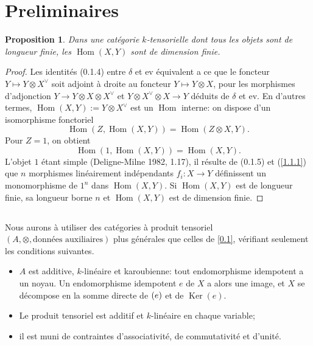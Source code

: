 \documentclass[11pt,a4paper]{article}
\theoremstyle{plain}
\newtheorem{proposition}[theorem]{Proposition}
\theoremstyle{definition}
\DeclareMathOperator{\Hom}{Hom}
\DeclareMathOperator{\Ker}{Ker}
\let\Im\relax
\DeclareMathOperator{\Im}{Im}
\newcommand{\ev}{\mathrm{ev}}
\begin{document}
\section{Preliminaires}\label{1}

\begin{proposition}\label{1.1}
Dans une cat\'egorie $k$-tensorielle dont tous les objets sont de longueur finie, les $\Hom(X,Y)$ sont de dimension finie.
\end{proposition}

\begin{proof}
Les identit\'es (0.1.4) entre $\delta$ et $\ev$ \'equivalent a ce que le foncteur $Y\mapsto Y\otimes X^\vee$ soit adjoint \`a droite au foncteur $Y\mapsto Y\otimes X$, pour les morphismes d'adjonction $Y\to Y\otimes X\otimes X^\vee$ et $Y\otimes X^\vee\otimes X\to Y$ d\'eduits de $\delta$ et $\ev$. En d'autres termes, $\Hom(X,Y):=Y\otimes X^\vee$ est un $\Hom$ interne: on dispose d'un isomorphisme fonctoriel
\[
\Hom(Z,\Hom(X,Y))=\Hom(Z\otimes X,Y).
\]
Pour $Z=1$, on obtient
\begin{equation}\label{1.1.1}
\Hom(1,\Hom(X,Y))=\Hom(X,Y).
\end{equation}
L'objet $1$ \'etant simple (Deligne-Milne 1982, 1.17), il r\'esulte de (0.1.5) et (\ref{1.1.1}) que $n$ morphismes lin\'eairement ind\'ependants $f_i:X\to Y$ d\'efinissent un monomorphisme de $1^n$ dans $\Hom(X,Y)$. Si $\Hom(X,Y)$ est de longueur finie, sa longueur borne $n$ et $\Hom(X,Y)$ est de dimension finie.
\end{proof}

\subsection{}\label{1.2}

Nous aurons \`a utiliser des cat\'egories \`a produit tensoriel $(A,\otimes,\text{donn\'ees auxiliaires})$ plus g\'en\'erales que celles de \ref{0.1}, v\'erifiant seulement les conditions suivantes.

\begin{itemize}
\item[(1.2.1)] $A$ est additive, $k$-lin\'eaire et karoubienne: tout endomorphisme idempotent a un noyau. Un endomorphisme idempotent $e$ de $X$ a alors une image, et $X$ se d\'ecompose en la somme directe de $\Im(e)$ et de $\Ker(e)$.
\item[(1.2.2)] Le produit tensoriel est additif et $k$-lin\'eaire en chaque variable;
\item[(1.2.3)] il est muni de contraintes d'associativit\'e, de commutativit\'e et d'unit\'e.
\end{itemize}
\end{document}
